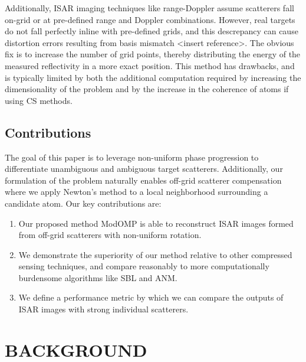 \documentclass[]{spie}  %
\begin{document}
Additionally, ISAR imaging techniques like range-Doppler assume scatterers fall on-grid or at pre-defined range and Doppler combinations. However, real targets do not fall perfectly inline with pre-defined grids, and this descrepancy can cause distortion errors resulting from basis mismatch <insert reference>. The obvious fix is to increase the number of grid points, thereby distributing the energy of the measured reflectivity in a more exact position. This method has drawbacks, and is typically limited by both the additional computation required by increasing the dimensionality of the problem and by the increase in the coherence of atoms if using CS methods.





 



\subsection{Contributions}

The goal of this paper is to leverage non-uniform phase progression to differentiate unambiguous and ambiguous target scatterers. Additionally, our formulation of the problem naturally enables off-grid scatterer compensation where we apply Newton's method to a local neighborhood surrounding a candidate atom. Our key contributions are:

\begin{enumerate}
    \item Our proposed method ModOMP is able to reconstruct ISAR images formed from off-grid scatterers with non-uniform rotation.
    \item We demonstrate the superiority of our method relative to other compressed sensing techniques, and compare reasonably to more computationally burdensome algorithms like SBL and ANM.
    \item We define a performance metric by which we can compare the outputs of ISAR images with strong individual scatterers.
\end{enumerate}

\section{BACKGROUND}
\end{document}

